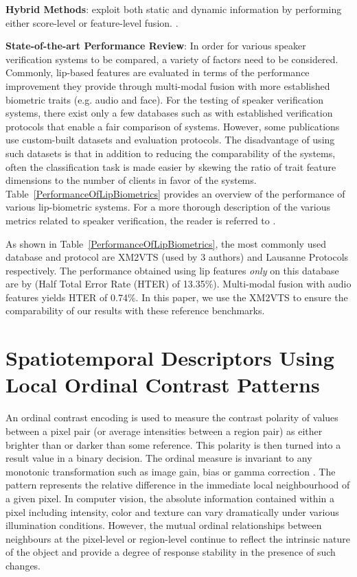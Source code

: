 \documentclass[a4paper, 10pt, conference]{ieeeconf}      %
\begin{document}
\noindent\textbf{Hybrid Methods}: exploit both static and dynamic information by performing either score-level or feature-level fusion. \cite{Auckenthaler99lip,Cetingul06Multi,Cetingul06Discriminative,Tamura04Multi,Abdulla09Lips,Wark97Person}.

\noindent\textbf{State-of-the-art Performance Review}: In order for various speaker verification systems to be compared, a variety of factors need to be considered. 
Commonly, lip-based features are evaluated in terms of the performance improvement they provide through multi-modal fusion with more established biometric traits (e.g. audio and face). 
For the testing of speaker verification systems, there exist only a few databases such as \cite{Messer99Xm2vts} with established verification protocols that enable a fair comparison of systems. 
However, some publications use custom-built datasets and evaluation protocols. 
The disadvantage of using such datasets is that in addition to reducing the comparability of the systems, often the classification task is made easier by skewing the ratio of trait feature dimensions to the number of clients in favor of the systems. 
Table~\ref{PerformanceOfLipBiometrics} provides an overview of the performance of various lip-biometric systems. 
For a more thorough description of the various metrics related to speaker verification, the reader is referred to \cite{Bengio01Evaluation}. 

As shown in Table~\ref{PerformanceOfLipBiometrics}, the most commonly used database and protocol are XM2VTS (used by 3 authors) and Lausanne Protocols respectively. 
The performance obtained using lip features \emph{only} on this database are by \cite{Ramos06Fusion}(Half Total Error Rate (HTER) of 13.35\%). Multi-modal fusion with audio features \cite{Ramos06Fusion} yields HTER of 0.74\%. 
In this paper, we use the XM2VTS to ensure the comparability of our results with these reference benchmarks.
\section{Spatiotemporal Descriptors Using Local Ordinal Contrast Patterns}
\label{OCP}
An ordinal contrast encoding is used to measure the contrast polarity of values between a pixel pair (or average intensities between a region pair) as either brighter than or darker than some reference. 
This polarity is then turned into a result value in a binary decision. 
The ordinal measure is invariant to any monotonic transformation such as image gain, bias or gamma correction \cite{conf/eccv/ZabihW94}. 
The pattern represents the relative difference in the immediate local neighbourhood of a given pixel. 
In computer vision, the absolute information contained within a pixel including intensity, color and texture can vary dramatically under various illumination conditions. 
However, the mutual ordinal relationships between neighbours at the pixel-level or region-level continue to reflect the intrinsic nature of the object and  provide a degree of response stability in the presence of such changes. 
\end{document}
